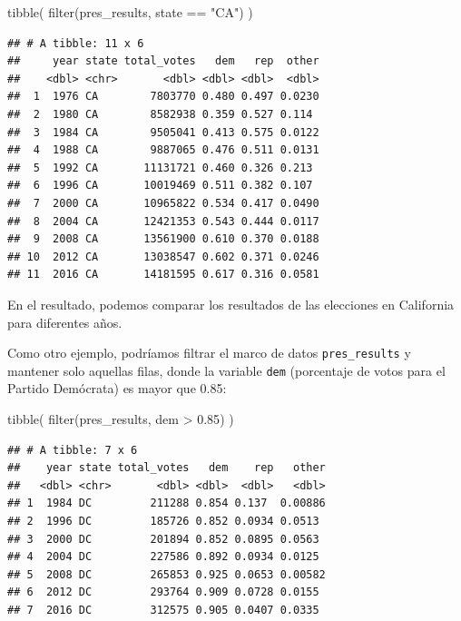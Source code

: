 \documentclass[
]{book}
\newenvironment{Shaded}{\begin{snugshade}}{\end{snugshade}}
\newcommand{\FloatTok}[1]{\textcolor[rgb]{0.00,0.00,0.81}{#1}}
\newcommand{\FunctionTok}[1]{\textcolor[rgb]{0.00,0.00,0.00}{#1}}
\newcommand{\NormalTok}[1]{#1}
\newcommand{\SpecialCharTok}[1]{\textcolor[rgb]{0.00,0.00,0.00}{#1}}
\newcommand{\StringTok}[1]{\textcolor[rgb]{0.31,0.60,0.02}{#1}}
\begin{document}
\begin{Shaded}
\begin{Highlighting}[]
\FunctionTok{tibble}\NormalTok{(}
\FunctionTok{filter}\NormalTok{(pres\_results, state }\SpecialCharTok{==} \StringTok{"CA"}\NormalTok{)}
\NormalTok{)}
\end{Highlighting}
\end{Shaded}

\begin{verbatim}
## # A tibble: 11 x 6
##     year state total_votes   dem   rep  other
##    <dbl> <chr>       <dbl> <dbl> <dbl>  <dbl>
##  1  1976 CA        7803770 0.480 0.497 0.0230
##  2  1980 CA        8582938 0.359 0.527 0.114 
##  3  1984 CA        9505041 0.413 0.575 0.0122
##  4  1988 CA        9887065 0.476 0.511 0.0131
##  5  1992 CA       11131721 0.460 0.326 0.213 
##  6  1996 CA       10019469 0.511 0.382 0.107 
##  7  2000 CA       10965822 0.534 0.417 0.0490
##  8  2004 CA       12421353 0.543 0.444 0.0117
##  9  2008 CA       13561900 0.610 0.370 0.0188
## 10  2012 CA       13038547 0.602 0.371 0.0246
## 11  2016 CA       14181595 0.617 0.316 0.0581
\end{verbatim}

En el resultado, podemos comparar los resultados de las elecciones en California para diferentes años.

Como otro ejemplo, podríamos filtrar el marco de datos \texttt{pres\_results} y mantener solo aquellas filas, donde la variable \texttt{dem} (porcentaje de votos para el Partido Demócrata) es mayor que 0.85:

\begin{Shaded}
\begin{Highlighting}[]
\FunctionTok{tibble}\NormalTok{(}
\FunctionTok{filter}\NormalTok{(pres\_results, dem }\SpecialCharTok{\textgreater{}} \FloatTok{0.85}\NormalTok{)}
\NormalTok{)}
\end{Highlighting}
\end{Shaded}

\begin{verbatim}
## # A tibble: 7 x 6
##    year state total_votes   dem    rep   other
##   <dbl> <chr>       <dbl> <dbl>  <dbl>   <dbl>
## 1  1984 DC         211288 0.854 0.137  0.00886
## 2  1996 DC         185726 0.852 0.0934 0.0513 
## 3  2000 DC         201894 0.852 0.0895 0.0563 
## 4  2004 DC         227586 0.892 0.0934 0.0125 
## 5  2008 DC         265853 0.925 0.0653 0.00582
## 6  2012 DC         293764 0.909 0.0728 0.0155 
## 7  2016 DC         312575 0.905 0.0407 0.0335
\end{verbatim}
\end{document}
